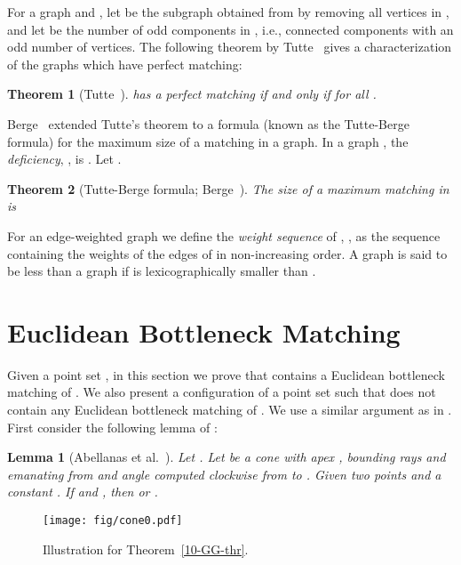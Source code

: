 \documentclass[11pt,a4paper]{article}
\newcommand{\kGG}[2]{}
\newcommand{\WS}[1]{\text{WS}}
\newtheorem{lemma}{Lemma}
\newtheorem{theorem}{Theorem}
\begin{document}
For a graph  and , let  be the subgraph obtained from  by removing all vertices in , and let  be the number of odd components in , i.e., connected components with an odd number of vertices. The following theorem by Tutte~\cite{Tutte1947} gives a characterization of the graphs which have perfect matching: 

\begin{theorem}[Tutte~\cite{Tutte1947}] 
\label{Tutte} 
 has a perfect matching if and only if  for all .
\end{theorem}

Berge~\cite{Berge1958} extended Tutte’s theorem to a formula (known as the Tutte-Berge formula) for the maximum size of a matching in a graph. In a graph , the {\em deficiency}, , is . Let .

\begin{theorem}[Tutte-Berge formula; Berge~\cite{Berge1958}] 
\label{Berge} 
The size of a maximum matching in  is 
\end{theorem}

For an edge-weighted graph  we define the {\em weight sequence} of , \WS{G}, as the sequence containing the weights of the edges of  in non-increasing order. A graph  is said to be less than a graph  if \WS{G_1} is lexicographically smaller than \WS{G_2}.

\section{Euclidean Bottleneck Matching}
\label{bottleneck-section}
Given a point set , in this section we prove that \kGG{10}{} contains a Euclidean bottleneck matching of . We also present a configuration of a point set  such that \kGG{8}{} does not contain any Euclidean bottleneck matching of . We use a similar argument as in \cite{Abellanas2009, Chang1991}. First consider the following lemma of \cite{Abellanas2009}:
\begin{lemma}[Abellanas et al.~\cite{Abellanas2009}]
\label{cone-lemma}
Let . Let  be a cone with apex , bounding rays 
and  emanating from  and angle  computed clockwise from  to . Given two points  and a constant . If  and , then  or .
\end{lemma}

\begin{figure}[htb]
  \centering
  \texttt{[image: fig/cone0.pdf]}
 \caption{Illustration for Theorem~\ref{10-GG-thr}.}
  \label{10-GG-fig}
\end{figure}
\end{document}
